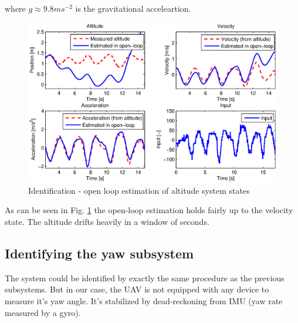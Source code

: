 where $g \approx 9.8 ms^{-2}$ is the gravitational acceleartion.

\begin{figure}[h]
\includegraphics[width=1\textwidth]{fig/iden4.eps} 
\caption{Identification - open loop estimation of altitude system states}
\label{fig:iden4}
\end{figure}

As can be seen in Fig. \ref{fig:iden4} the open-loop estimation holds fairly up to the velocity state. The altitude drifts heavily in a window of seconds.

\subsection{Identifying the yaw subsystem}

The system could be identified by exactly the same procedure as the previous subsystems. But in our case, the UAV is not equipped with any device to measure it's yaw angle. It's stabilized by dead-reckoning from IMU (yaw rate measured by a gyro).